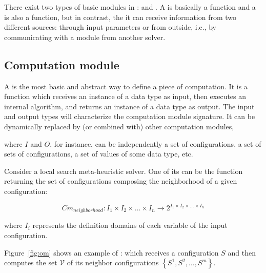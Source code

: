 There exist two types of basic modules in \posl: \INTROom{} and \INTROopch{}. A \om{} is basically a function and a \opch{} is also a function, but in contrast, the it can receive information from two different sources: through input parameters or from outside, i.e., by communicating with a module from another solver.

\subsection{Computation module}


A \om{} is the most basic and abstract way to define a piece of computation. It is a function which receives an instance of a \posl{} data type as input, then executes an internal algorithm, and returns an instance of a \posl{} data type as output. The input and output types will characterize the computation module signature. It can be dy\-na\-mi\-cally replaced by (or combined with) other computation modules, 


where $I$ and $O$, for instance, can be independently a set of configurations, a set of sets of configurations, a set of values of some data type, etc.

Consider a local search meta-heuristic solver. One of its \oms{} can be the function returning the set of configurations composing the neighborhood of a given configuration:

\begin{equation*}
Cm_{neighborhood}:I_1\times I_2\times\dots\times I_n \rightarrow 2^{I_1\times I_2\times\dots\times I_n}
\end{equation*}

\noindent where $I_i$ represents the definition domains of each variable of the input confi\-gura\-tion.

Figure~\ref{fig:om} shows an example of \om: which receives a configuration $S$ and then computes the set $\mathcal{V}$ of its neighbor configurations $\left\{S^1, S^2, \dots, S^m\right\}$.


